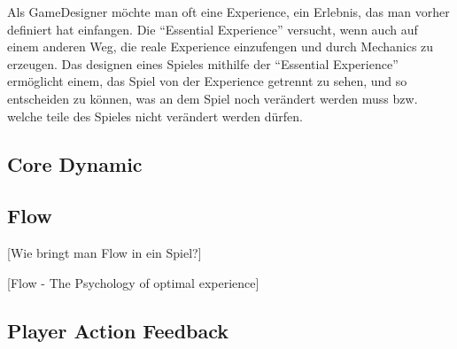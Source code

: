 Als GameDesigner möchte man oft eine Experience, ein Erlebnis, das man vorher definiert hat einfangen. Die "`Essential Experience"' versucht, wenn auch auf einem anderen Weg, die reale Experience einzufengen und durch Mechanics zu erzeugen. Das designen eines Spieles mithilfe der "`Essential Experience"' ermöglicht einem, das Spiel von der Experience getrennt zu sehen, und so entscheiden zu können, was an dem Spiel noch verändert werden muss bzw. welche teile des Spieles nicht verändert werden dürfen. \cite[S.55]{_art_of_gamedesign}

\subsection{Core Dynamic}



\subsection{Flow}

[Wie bringt man Flow in ein Spiel?]

\cite{_theory_of_fun}

[Flow - The Psychology of optimal experience]

\subsection{Player Action Feedback}

